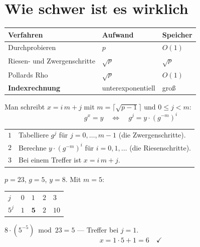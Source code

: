 \section{Wie schwer ist es wirklich}

\begin{merksatz}
\begin{center}
{\small
\renewcommand{\arraystretch}{1.52}
\begin{tabular}{@{}P{2.8cm}P{2.4cm}P{2.8cm}@{}}
\toprule
\textbf{Verfahren} & \textbf{Aufwand} & \textbf{Speicher}\\
\midrule
Durchprobieren & $p$ & $O(1)$\\
Riesen- und Zwergenschritte & $\sqrt p$ & $\sqrt p$\\
Pollards Rho & $\sqrt p$ & $O(1)$\\
\textbf{Indexrechnung} & \textcolor{akzent}{unter\-exponentiell} & groß\\
\bottomrule
\end{tabular}}
\end{center}

Man schreibt $x = i\,m + j$ mit $m = \lceil\sqrt{p-1}\rceil$ und $0 \le j < m$:
\[ g^{x} = y \quad\Longleftrightarrow\quad g^{j} = y\cdot(g^{-m})^{i} \]

\begin{center}
\renewcommand{\arraystretch}{1.5}
\begin{tabular}{@{}P{1.0cm}P{7.4cm}@{}}
\toprule
$1$ & Tabelliere $g^{j}$ für $j = 0,\ldots,m-1$ (die Zwergenschritte).\\
$2$ & Berechne $y\cdot(g^{-m})^{i}$ für $i = 0,1,\ldots$ (die Riesenschritte).\\
$3$ & Bei einem Treffer ist $x = i\,m+j$.\\
\bottomrule
\end{tabular}
\end{center}

 $p=23$, $g=5$, $y=8$. Mit $m=5$:
\begin{center}
\renewcommand{\arraystretch}{1.46}
\begin{tabular}{@{}P{1.2cm}P{1.2cm}P{1.2cm}P{1.2cm}P{1.2cm}@{}}
\toprule
$j$ & $0$ & $1$ & $2$ & $3$\\
$5^j$ & $1$ & $\mathbf{5}$ & $2$ & $10$\\
\bottomrule
\end{tabular}
\end{center}

 $8\cdot(5^{-5}) \bmod 23 = 5$ --- Treffer bei $j=1$.
\[ x = 1\cdot5 + 1 = 6 \quad \checkmark \]

\begin{center}
\begin{minipage}{0.88\textwidth}
\end{minipage}
\end{center}
\end{merksatz}

